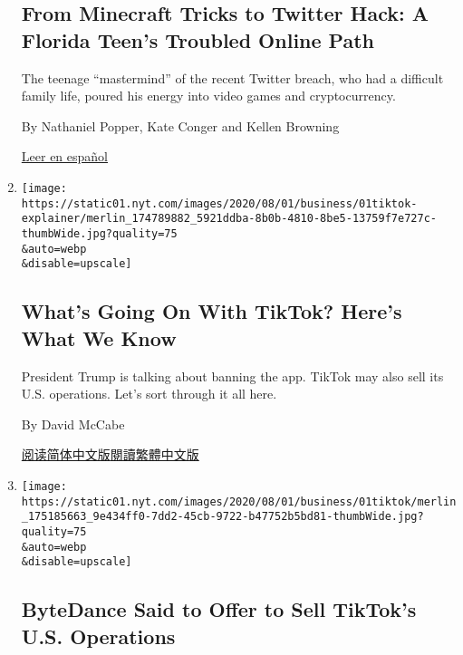 \begin{enumerate}
  \hypertarget{from-minecraft-tricks-to-twitter-hack-a-florida-teens-troubled-online-path}{%
  \subsection{From Minecraft Tricks to Twitter Hack: A Florida Teen's
  Troubled Online
  Path}\label{from-minecraft-tricks-to-twitter-hack-a-florida-teens-troubled-online-path}}

  The teenage ``mastermind'' of the recent Twitter breach, who had a
  difficult family life, poured his energy into video games and
  cryptocurrency.

  By Nathaniel Popper, Kate Conger and Kellen Browning

  \href{https://www.nytimes.com/es/2020/08/04/espanol/negocios/joven-florida-hacker-twitter.html}{Leer
  en español}
\item
  \href{/2020/08/01/technology/tiktok-trump-microsoft-bytedance-china-ban.html}{}

  \texttt{[image: https://static01.nyt.com/images/2020/08/01/business/01tiktok-explainer/merlin\_174789882\_5921ddba-8b0b-4810-8be5-13759f7e727c-thumbWide.jpg?quality=75\\\&auto=webp\\\&disable=upscale]}

  \hypertarget{whats-going-on-with-tiktok-heres-what-we-know}{%
  \subsection{What's Going On With TikTok? Here's What We
  Know}\label{whats-going-on-with-tiktok-heres-what-we-know}}

  President Trump is talking about banning the app. TikTok may also sell
  its U.S. operations. Let's sort through it all here.

  By David McCabe

  \href{https://cn.nytimes.com/technology/20200803/tiktok-trump-microsoft-bytedance-china-ban/}{阅读简体中文版}\href{https://cn.nytimes.com/technology/20200803/tiktok-trump-microsoft-bytedance-china-ban/zh-hant/}{閱讀繁體中文版}
\item
  \href{/2020/08/01/technology/tiktok-sale-trump-ban.html}{}

  \texttt{[image: https://static01.nyt.com/images/2020/08/01/business/01tiktok/merlin\_175185663\_9e434ff0-7dd2-45cb-9722-b47752b5bd81-thumbWide.jpg?quality=75\\\&auto=webp\\\&disable=upscale]}

  \hypertarget{bytedance-said-to-offer-to-sell-tiktoks-us-operations}{%
  \subsection{ByteDance Said to Offer to Sell TikTok's U.S.
  Operations}\label{bytedance-said-to-offer-to-sell-tiktoks-us-operations}}


\end{enumerate}
